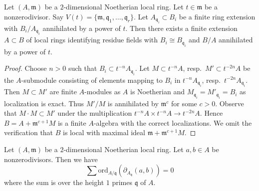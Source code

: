\begin{lemma}
\label{lemma-perpare-key}
Let $(A, \mathfrak m)$ be a $2$-dimensional Noetherian local ring.
Let $t \in \mathfrak m$ be a nonzerodivisor. Say
$V(t) = \{\mathfrak m, \mathfrak q_1, \ldots, \mathfrak q_r\}$.
Let $A_{\mathfrak q_i} \subset B_i$ be a finite ring
extension with $B_i/A_{\mathfrak q_i}$ annihilated by a power of
$t$. Then there exists a finite extension $A \subset B$ of
local rings identifying residue fields
with $B_i \cong B_{\mathfrak q_i}$ and $B/A$ annihilated
by a power of $t$.
\end{lemma}

\begin{proof}
Choose $n > 0$ such that $B_i \subset t^{-n}A_{\mathfrak q_i}$.
Let $M \subset t^{-n}A$, resp.\ $M' \subset t^{-2n}A$ be the
$A$-submodule consisting of elements mapping to $B_i$ in
$t^{-n}A_{\mathfrak q_i}$, resp.\ $t^{-2n}A_{\mathfrak q_i}$.
Then $M \subset M'$ are finite $A$-modules as $A$ is Noetherian
and $M_{\mathfrak q_i} = M'_{\mathfrak q_i} = B_i$ as localization
is exact. Thus $M'/M$ is annihilated by $\mathfrak m^c$ for some
$c > 0$. Observe that $M \cdot M \subset M'$ under the multiplication
$t^{-n}A \times t^{-n}A \to t^{-2n}A$. Hence
$B = A + \mathfrak m^{c + 1}M$ is a finite $A$-algebra with the correct
localizations. We omit the verification that $B$ is local with
maximal ideal $\mathfrak m + \mathfrak m^{c + 1}M$.
\end{proof}

\begin{lemma}
\label{lemma-key-nonzerodivisors}
Let $(A, \mathfrak m)$ be a $2$-dimensional Noetherian local ring.
Let $a, b \in A$ be nonzerodivisors.
Then we have
$$
\sum
\text{ord}_{A/\mathfrak q}(\partial_{A_{\mathfrak q}}(a, b))
=
0
$$
where the sum is over the height $1$ primes $\mathfrak q$ of $A$.
\end{lemma}

